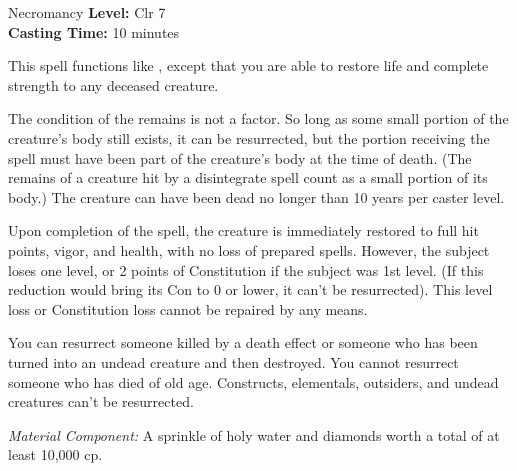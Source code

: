 {Necromancy}
{
	\textbf{Level:}
	Clr 7\\
	\textbf{Casting Time:}
	10 minutes\\
}
{
	This spell functions like , except that you are able to restore life and complete strength to any deceased creature.

	The condition of the remains is not a factor. So long as some small portion of the creature's body still exists, it can be resurrected, but the portion receiving the spell must have been part of the creature's body at the time of death. (The remains of a creature hit by a disintegrate spell count as a small portion of its body.) The creature can have been dead no longer than 10 years per caster level.

	Upon completion of the spell, the creature is immediately restored to full hit points, vigor, and health, with no loss of prepared spells. However, the subject loses one level, or 2 points of Constitution if the subject was 1st level. (If this reduction would bring its Con to 0 or lower, it can't be resurrected). This level loss or Constitution loss cannot be repaired by any means.

	You can resurrect someone killed by a death effect or someone who has been turned into an undead creature and then destroyed. You cannot resurrect someone who has died of old age. Constructs, elementals, outsiders, and undead creatures can't be resurrected.

	\textit{Material Component:}
	A sprinkle of holy water and diamonds worth a total of at least 10,000 cp.

}
